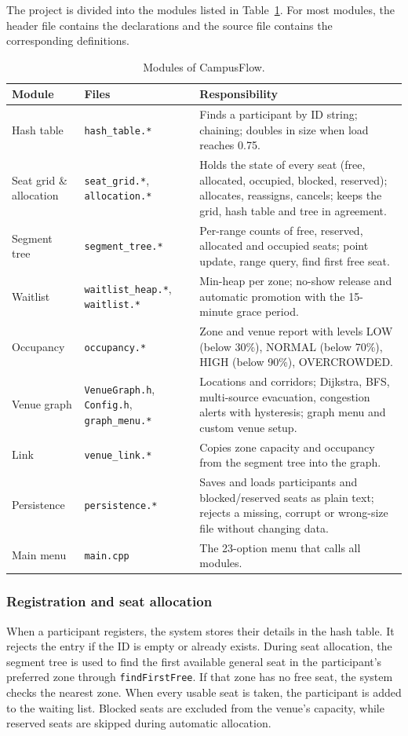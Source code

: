 \documentclass[11pt,a4paper]{article}
\newcommand{\code}[1]{\texttt{#1}}
\begin{document}
The project is divided into the modules listed in Table~\ref{tab:modules}.
For most modules, the header file contains the declarations and the source
file contains the corresponding definitions.

\begin{table}[ht]
\centering
\small
\begin{tabularx}{\textwidth}{@{}l>{\raggedright\arraybackslash}p{3.4cm}>{\raggedright\arraybackslash}X@{}}
\toprule
\textbf{Module} & \textbf{Files} & \textbf{Responsibility}\\
\midrule
Hash table & \code{hash\_table.*} & Finds a participant by ID string; chaining; doubles in size when load reaches 0.75.\\
Seat grid \& allocation & \code{seat\_grid.*}, \code{allocation.*} & Holds the state of every seat (free, allocated, occupied, blocked, reserved); allocates, reassigns, cancels; keeps the grid, hash table and tree in agreement.\\
Segment tree & \code{segment\_tree.*} & Per-range counts of free, reserved, allocated and occupied seats; point update, range query, find first free seat.\\
Waitlist & \code{waitlist\_heap.*}, \code{waitlist.*} & Min-heap per zone; no-show release and automatic promotion with the 15-minute grace period.\\
Occupancy & \code{occupancy.*} & Zone and venue report with levels LOW (below 30\%), NORMAL (below 70\%), HIGH (below 90\%), OVERCROWDED.\\
Venue graph & \code{VenueGraph.h}, \code{Config.h}, \code{graph\_menu.*} & Locations and corridors; Dijkstra, BFS, multi-source evacuation, congestion alerts with hysteresis; graph menu and custom venue setup.\\
Link & \code{venue\_link.*} & Copies zone capacity and occupancy from the segment tree into the graph.\\
Persistence & \code{persistence.*} & Saves and loads participants and blocked/reserved seats as plain text; rejects a missing, corrupt or wrong-size file without changing data.\\
Main menu & \code{main.cpp} & The 23-option menu that calls all modules.\\
\bottomrule
\end{tabularx}
\caption{Modules of CampusFlow.}
\label{tab:modules}
\end{table}

\subsubsection*{Registration and seat allocation}
When a participant registers, the system stores their details in the hash
table. It rejects the entry if the ID is empty or already exists. During seat
allocation, the segment tree is used to find the first available general seat
in the participant's preferred zone through \code{findFirstFree}. If that zone
has no free seat, the system checks the nearest zone. When every usable seat is
taken, the participant is added to the waiting list. Blocked seats are excluded
from the venue's capacity, while reserved seats are skipped during automatic
allocation.
\end{document}
